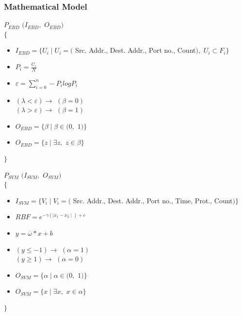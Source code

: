 \documentclass[10pt]{beamer}
\begin{document}
\begin{frame}
\frametitle{Mathematical Model}
\footnotesize
$P_{EBD} $ $ (I_{EBD},$ $O_{EBD})$\\
$\lbrace$


\begin{itemize}
\footnotesize
\item $I_{EBD} = \lbrace U_{i} \mid U_{i} = ($ Src. Addr., Dest. Addr., Port no., Count$),  $ $ U_{i}  \subset F_{i} \rbrace$

\item $P_{i} = \frac{C_{i}}{N}$  

\item $\varepsilon = \sum_{i=0}^{n} - P_{i} log P_{i}$

\item $(\lambda < \varepsilon) \rightarrow  $ $ (\beta = 0)$ \\ $(\lambda > \varepsilon) \rightarrow  $ $ (\beta = 1)$

\item $ O_{EBD} = \lbrace \beta \mid \beta \in (0, $ $1) \rbrace$

\item $O_{EBD} = \lbrace z \mid \exists z, $ $ z \in \beta \rbrace$ \\

\end{itemize}
$ \rbrace$
\newline

$P_{SVM} $ $ (I_{SVM},$ $O_{SVM})$\\
$\lbrace$
\indent
\begin{itemize}
\footnotesize
\item $I_{SVM} = \lbrace V_{i} \mid V_{i} = ($ Src. Addr., Dest. Addr., Port no., Time, Prot., Count$) \rbrace$

\item $RBF = e^{-\gamma(\mid x_{1}-x_{2} \mid)+c}$ 

\item $y = \overline{\omega} * x + b$ 

\item $(y \leq -1) \rightarrow  $ $ (\alpha = 1)$ \\ $(y \geq 1) \rightarrow  $ $ (\alpha = 0)$

\item $ O_{SVM} = \lbrace \alpha \mid \alpha \in (0, $ $1) \rbrace$

\item $O_{SVM} = \lbrace x \mid \exists x, $ $ x \in \alpha \rbrace$ \\

\end{itemize}
$ \rbrace$

\end{frame}
\end{document}
